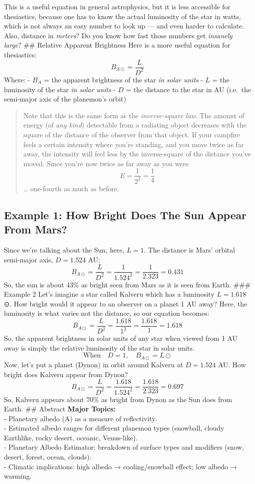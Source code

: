 \documentclass[
  letterpaper,
]{book}
\begin{document}
This is a useful equation in general astrophysics, but it is less
accessible for thesiastics, because one has to know the actual
luminosity of the star in watts, which is not always an easy number to
look up --- and even harder to calculate. Also, distance in
\emph{meters}? Do you know how fast those numbers get \emph{insanely
large}? \#\# Relative Apparent Brightness Here is a more useful equation
for thesiastics: \[
B_{A⊙} = \dfrac{L}{D^2}
\] Where: - \(B_A\) = the apparent brightness of the star \emph{in solar
units} - \(L\) = the luminosity of the star \emph{in solar units} -
\(D\) = the distance to the star in AU (i.e.~the semi-major axis of the
planemon's orbit)

\begin{quote}
Note that this is the same form as the \emph{inverse-square law}. The
amount of energy (of \emph{any kind}) detectable from a radiating object
decreases with the square of the distance of the observer from that
object. If your campfire feels a certain intensity where you're
standing, and you move twice as far away, the intensity will feel less
by the inverse-square of the distance you've moved. Since you're now
twice as far away as you were \[
E = \dfrac{1}{2^2} = \dfrac{1}{4}
\] \ldots{} one-fourth as much as before.
\end{quote}

\subsection{Example 1: How Bright Does The Sun Appear From
Mars?}\label{example-1-how-bright-does-the-sun-appear-from-mars}

Since we're talking about the Sun, here, \(L = 1\). The distance is
Mars' orbital semi-major axis, \(D = 1.524\) AU: \[
B_{A⊙} = \dfrac{L}{D^2} = \dfrac{1}{1.524^2} = \dfrac{1}{2.323} = 0.431
\] So, the sun is about 43\% as bright seen from Mars as it is seen from
Earth. \#\#\# Example 2 Let's imagine a star called Kalveru which has a
luminosity \(L=1.618\)⊙. How bright would it appear to an observer on a
planet 1 AU away? Here, the luminosity is what varies not the distance,
so our equation becomes: \[
B_{A⊙} = \dfrac{L}{D^2} = \dfrac{1.618}{1^2} = \dfrac{1.618}{1} = 1.618
\] So, the apparent brightness in solar units of any star when viewed
from 1 AU away is simply the relative luminosity of the star in solar
units. \[
\text{When}\quad D = 1, \quad B_{A⊙} = L⊙
\] Now, let's put a planet (Dynon) in orbit around Kalveru at
\(D = 1.524\) AU. How bright does Kalveru appear from Dynon? \[
B_{A⊙} = \dfrac{L}{D^2} = \dfrac{1.618}{1.524^2} = \dfrac{1.618}{2.323} = 0.697
\] So, Kalveru appears about 70\% as bright from Dynon as the Sun does
from Earth. \#\# Abstract \textbf{Major Topics:}\\
- Planetary albedo (A) as a measure of reflectivity.\\
- Estimated albedo ranges for different planemon types (snowball, cloudy
Earthlike, rocky desert, oceanic, Venus-like).\\
- Planetary Albedo Estimator: breakdown of surface types and modifiers
(snow, desert, forest, ocean, clouds).\\
- Climatic implications: high albedo → cooling/snowball effect; low
albedo → warming.
\end{document}

